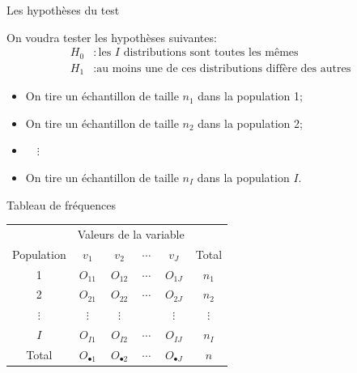 \documentclass{BeamerTemplate}
\begin{document}
\begin{frame}[t]{Les hypothèses du test}

On voudra tester les hypothèses suivantes:
\begin{align*}
H_0&: \text{les } I \text{ distributions sont toutes les mêmes}\\
H_1&: \text{au moins une de ces distributions diffère des autres}
\end{align*}

\begin{itemize}\itemsep1mm
  \item On tire un échantillon de taille $n_1$ dans la population 1;
  \item On tire un échantillon de taille $n_2$ dans la population 2;
  \item[] $\quad\vdots$
  \item On tire un échantillon de taille $n_I$ dans la population $I$.
\end{itemize}


\end{frame}

\begin{frame}[t]{Tableau de fréquences}

\begin{center}
\renewcommand{\arraystretch}{1.5}
\begin{tabular}{c|cccc|c}
 & \multicolumn{4}{c|}{Valeurs de la variable} & \\
Population & $v_1$ & $v_2$ & $\cdots$ & $v_J$ & Total\\
\hline
1 & $O_{11}$ & $O_{12}$ & $\cdots$ & $O_{1J}$ & $n_1$\\
2 & $O_{21}$ & $O_{22}$ & $\cdots$ & $O_{2J}$ & $n_2$\\
$\vdots$ & $\vdots$ & $\vdots$ & & $\vdots$ & $\vdots$\\
$I$ & $O_{I1}$ & $O_{I2}$ & $\cdots$ & $O_{IJ}$ & $n_I$\\
\hline
Total & $O_{\bullet1}$ & $O_{\bullet2}$ & $\cdots$ & $O_{\bullet J}$ & $n$\\
\end{tabular}
\end{center}

\end{frame}
\end{document}
